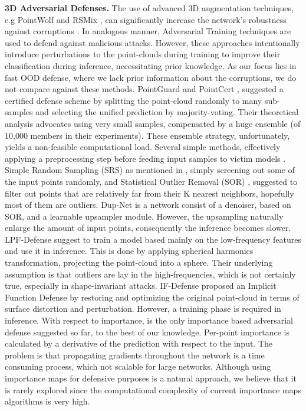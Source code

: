 \documentclass[10pt,twocolumn,letterpaper]{article}
\begin{document}
\textbf{3D Adversarial Defenses.} The use of advanced 3D augmentation techniques, e.g PointWolf \cite{pointwolf} and RSMix \cite{rsmix}, can significantly increase the network's robustness against corruptions \cite{modelnet_c}. In analogous manner, Adversarial Training techniques \cite{Ensemble_adversarial_training, Pointcutmix, extending_adversarial_attacks_and_defenses, adversarial_attack_and_defense, pagn, lpf_defense, point_acl} are used to defend against malicious attacks.
However, these approaches intentionally introduce perturbations to the point-clouds during training to improve their classification during inference, necessitating prior knowledge. As our focus lies in fast OOD defense, where we lack prior information about the corruptions, we do not compare against these methods.
PointGuard \cite{pointguard} and PointCert \cite{point_cert}, suggested a certified defense scheme by splitting the point-cloud randomly to many sub-samples and selecting the unified prediction by majority-voting. Their theoretical analysis advocates using very small samples, compensated by a huge ensemble (of 10,000 members in their experiments). 
These ensemble strategy, unfortunately, yields a non-feasible computational load.
Several simple methods, effectively applying a preprocessing step before feeding input samples to victim models \cite{dupnet, lpf_defense, if_defense,extending_adversarial_attacks_and_defenses, sor}.
Simple Random Sampling (SRS) as mentioned in \cite{dupnet}, simply screening out some of the input points randomly, and Statistical Outlier Removal (SOR) \cite{sor}, suggested to filter out points that are relatively far from their K nearest neighbors, hopefully most of them are outliers.
Dup-Net\cite{dupnet} is a network consist of a denoiser, based on SOR, and a learnable upsampler module. However, the upsampling naturally enlarge the amount of input points, consequently the inference becomes slower.
LPF-Defense\cite{lpf_defense} suggest to train a model based mainly on the low-frequency features and use it in inference. This is done by applying spherical harmonics transformation, projecting the point-cloud into a sphere. Their underlying assumption is that outliers are lay in the high-frequencies, which is not certainly true, especially in shape-invariant attacks.
IF-Defense\cite{if_defense} proposed an Implicit Function Defense by restoring and optimizing the original point-cloud in terms of surface distortion and perturbation. However, a training phase is required in inference. With respect to importance, \cite{extending_adversarial_attacks_and_defenses} is the only importance based adversarial defense suggested so far, to the best of our knowledge. Per-point importance is calculated by a derivative of the prediction with respect to the input. The problem is that propagating gradients throughout the network is a time consuming process, which not scalable for large networks. Although using importance maps for defensive purposes is a natural approach, we believe that it is rarely explored since the computational complexity of current importance maps algorithms is very high.
\end{document}
